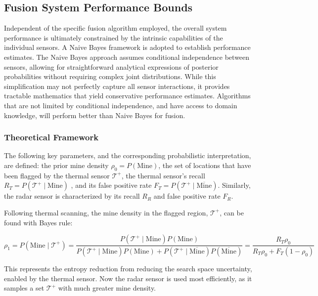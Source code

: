 \subsection{Fusion System Performance Bounds}\label{fusion_bounds}

    Independent of the specific fusion algorithm employed, the overall system performance is ultimately constrained by the intrinsic capabilities of the individual sensors. A Naive Bayes framework is adopted to establish performance estimates. The Naive Bayes approach assumes conditional independence between sensors, allowing for straightforward analytical expressions of posterior probabilities without requiring complex joint distributions. While this simplification may not perfectly capture all sensor interactions, it provides tractable mathematics that yield conservative performance estimates. Algorithms that are not limited by conditional independence, and have access to domain knowledge, will perform better than Naive Bayes for fusion.
        
    \subsubsection{Theoretical Framework}
        
        The following key parameters, and the corresponding probabilistic interpretation, are defined: the prior mine density $\rho_0 = P(\text{Mine})$, the set of locations that have been flagged by the thermal sensor \(\mathcal{T}^+\), the thermal sensor's recall $R_T = P(\mathcal{T}^+\mid\text{Mine})$ , and its false positive rate $F_T = P(\mathcal{T}^+ \mid \overline{\text{Mine}})$. Similarly, the radar sensor is characterized by its recall $R_R$ and false positive rate $F_R$.
        
        Following thermal scanning, the mine density in the flagged region, $\mathcal{T}^+$, can be found with Bayes rule:
        
        \begin{equation}
        \rho_1 = P(\text{Mine} \mid \mathcal{T}^+) =\frac{P(\mathcal{T}^+\mid\text{Mine})P(\text{Mine})}{P(\mathcal{T}^+\mid\text{Mine})P(\text{Mine})+ P(\mathcal{T}^+\mid \overline{\text{Mine}})P(\overline{\text{Mine}})} =\frac{R_T \rho_0}{R_T \rho_0 + F_T (1 - \rho_0)}
        \end{equation}
        
        This represents the entropy reduction from reducing the search space uncertainty, enabled by the thermal sensor. Now the radar sensor is used most efficiently, as it samples a set \(\mathcal{T}^+\) with much greater mine density. 
        
